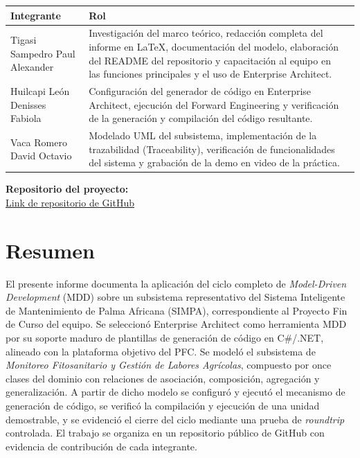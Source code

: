 \documentclass[11pt,a4paper]{article}
\begin{document}
\begin{titlepage}
\begin{center}
\begin{tabularx}{\textwidth}{lXX}
				\textbf{Integrante} & \textbf{Rol} \\
				\hline
				Tigasi Sampedro Paul Alexander &
				Investigación del marco teórico, redacción completa del informe en LaTeX, documentación del modelo, elaboración del README del repositorio y capacitación al equipo en las funciones principales y el uso de Enterprise Architect. \\
				\hline
				Huilcapi León Denisses Fabiola &
				Configuración del generador de código en Enterprise Architect, ejecución del Forward Engineering y verificación de la generación y compilación del código resultante. \\
				\hline
				Vaca Romero David Octavio &
				Modelado UML del subsistema, implementación de la trazabilidad (Traceability), verificación de funcionalidades del sistema y grabación de la demo en video de la práctica. \\
				
				\bottomrule
			\end{tabularx}
		\end{center}
		
		\vspace{1.0cm}
		{\normalsize \textbf{Repositorio del proyecto:}}\\
		\vspace{0.5cm}
		\href{https://github.com/ptigasis-Alexander/-PFC-SIMPA-MDD-Tigasi_Huilcapi_Vaca}{Link de repositorio de GitHub}
		
		\vfill
		
	\end{titlepage}
	
	\section*{Resumen}
	El presente informe documenta la aplicación del ciclo completo de \textit{Model-Driven Development} (MDD) sobre un subsistema representativo del Sistema Inteligente de Mantenimiento de Palma Africana (SIMPA), correspondiente al Proyecto Fin de Curso del equipo. Se seleccionó Enterprise Architect como herramienta MDD por su soporte maduro de plantillas de generación de código en C\#/.NET, alineado con la plataforma objetivo del PFC. Se modeló el subsistema de \textit{Monitoreo Fitosanitario y Gestión de Labores Agrícolas}, compuesto por once clases del dominio con relaciones de asociación, composición, agregación y generalización. A partir de dicho modelo se configuró y ejecutó el mecanismo de generación de código, se verificó la compilación y ejecución de una unidad demostrable, y se evidenció el cierre del ciclo mediante una prueba de \textit{roundtrip} controlada. El trabajo se organiza en un repositorio público de GitHub con evidencia de contribución de cada integrante.
	
\end{document}
